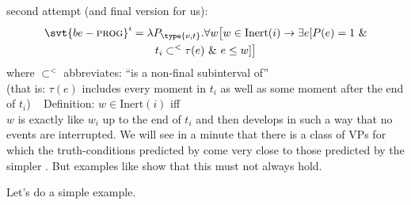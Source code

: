 \ex{}%
second attempt (and final version for us):\label{ex:prog-dowty}
\begin{multline*}
  \svt{be-\prog}^{i} = \lambda P_{\type{\nu,t}}. \forall w \bigl[w \in
\text{Inert}(i) \rightarrow \exists e [P(e) = 1\ \& \\
t_{i} \subset^{<} \tau(e)\ \&\ e \le w]\bigr]
\end{multline*}
where $\subset^{<}$ abbreviates: ``is a non-final subinterval of''\\
(that is: $\tau(e)$ includes every moment in $t_{i}$ as well as some moment
after the end of $t_{i}$) \xe
\ex~ Definition: $w \in \text{Inert}(i)$  iff\\
$w$ is exactly like $w_{i}$ up to the end of $t_{i}$ and then develops in such a
way that no events are interrupted. \xe
%
We will see in a minute that there is a class of VPs for which the
truth-conditions predicted by \LLast come very close to those predicted by the
simpler . But examples like  show that
this must not always hold.

Let's do a simple example.

